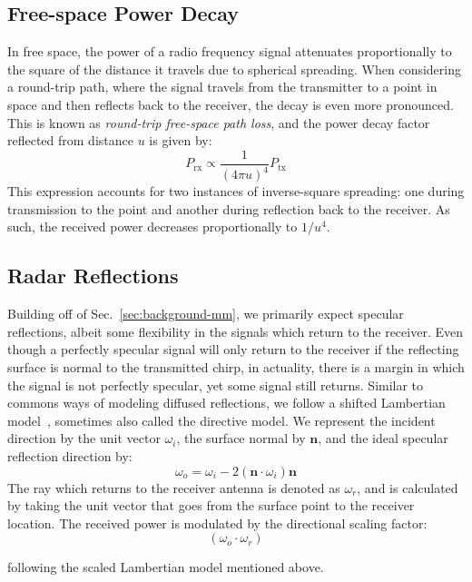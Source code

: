 \subsection{Free-space Power Decay}\label{sec:app-radar-pwr}
In free space, the power of a radio frequency signal attenuates proportionally to the square of the distance it travels due to spherical spreading. 
When considering a round-trip path, where the signal travels from the transmitter to a point in space and then reflects back to the receiver, the decay is even more pronounced. 
This is known as \textit{round-trip free-space path loss}, and the power decay factor reflected from distance \( u \) is given by:
\begin{equation}
\label{eq:reflection_dist}
P_{\text{rx}} \propto \frac{1}{(4\pi u)^4} P_{\text{tx}}
\end{equation}
This expression accounts for two instances of inverse-square spreading: one during transmission to the point and another during reflection back to the receiver. 
As such, the received power decreases proportionally to \( 1/u^4 \).


\subsection{Radar Reflections}\label{sec:app-radar-ref}
Building off of Sec.~\ref{sec:background-mm}, we primarily expect specular reflections, albeit some flexibility in the signals which return to the receiver. Even though a perfectly specular signal will only return to the receiver if the reflecting surface is normal to the transmitted chirp, in actuality, there is a margin in which the signal is not perfectly specular, yet some signal still returns. Similar to commons ways of modeling diffused reflections, we follow a shifted Lambertian model~\cite{richards2010principles, ren2020diffuse}, sometimes also called the directive model.
We represent the incident direction by the unit vector \( \omega_i \), the surface normal by \( \mathbf{n} \), and the ideal specular reflection direction by:
\begin{equation}
     \omega_o =  \omega_i - 2(\mathbf{n} \cdot \omega_i)\mathbf{n}
\end{equation}
The ray which returns to the receiver antenna is denoted as \( \omega_r \), and is calculated by taking the unit vector that goes from the surface point to the receiver location.
The received power is modulated by the directional scaling factor:
\begin{equation}
(\omega_o \cdot \omega_r)
\end{equation}

following the scaled Lambertian model mentioned above.

